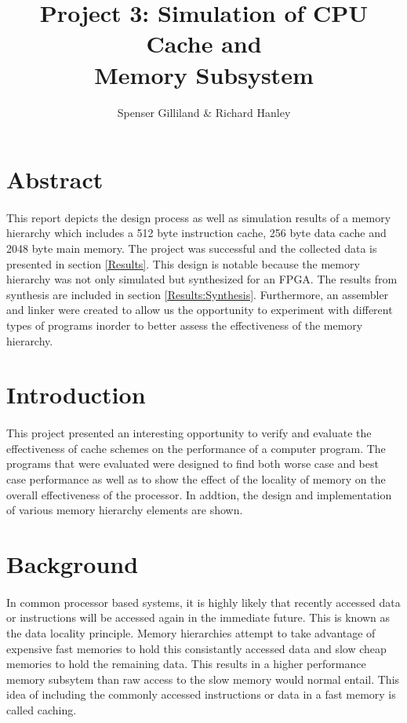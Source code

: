 \documentclass[11pt,letterpaper,final]{article}
\author{Spenser Gilliland \& Richard Hanley}
\title{Project 3: Simulation of CPU Cache and \\ Memory Subsystem}
\begin{document}
\maketitle
\bigskip
\bigskip
\bigskip

\section{ Abstract }
\paragraph{}
This report depicts the design process as well as simulation results of a memory hierarchy which includes a 512 byte instruction cache, 256 byte data cache and 2048 byte main memory.  The project was successful and the collected data is presented in section \ref{Results}.  This design is notable because the memory hierarchy was not only simulated but synthesized for an FPGA.  The results from synthesis are included in section \ref{Results:Synthesis}.  Furthermore, an assembler and linker were created to allow us the opportunity to experiment with different types of programs inorder to better assess the effectiveness of the memory hierarchy.

\pagebreak
\section{ Introduction }
\paragraph{}
This project presented an interesting opportunity to verify and evaluate the effectiveness of cache schemes on the performance of a computer program.  The programs that were evaluated were designed to find both worse case and best case performance as well as to show the effect of the locality of memory on the overall effectiveness of the processor. In addtion, the design and implementation of various memory hierarchy elements are shown.

\section{ Background }
\paragraph{}
In common processor based systems, it is highly likely that recently accessed data or instructions will be accessed again in the immediate future.  This is known as the data locality principle.  Memory hierarchies attempt to take advantage of expensive fast memories to hold this consistantly accessed data and slow cheap memories to hold the remaining data.  This results in a higher performance memory subsytem than raw access to the slow memory would normal entail.  This idea of including the commonly accessed instructions or data in a fast memory is called caching.
\end{document}
